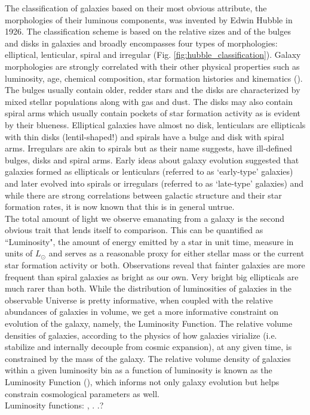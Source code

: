The classification of galaxies based on their most obvious attribute, the morphologies of their luminous components, was invented by Edwin Hubble in 1926. The classification scheme is based on the relative sizes and of the bulges and disks in galaxies and broadly encompasses four types of morphologies: elliptical, lenticular, spiral and irregular (Fig. \ref{fig:hubble_classification}). Galaxy morphologies are strongly correlated with their other physical properties such as luminosity, age, chemical composition, star formation histories and kinematics (\citealt{roberts94a}). The bulges usually contain older, redder stars and the disks are characterized by mixed stellar populations along with gas and dust. The disks may also contain spiral arms which usually contain pockets of star formation activity as is evident by their blueness. Elliptical galaxies have almost no disk, lenticulars are ellipticals with thin disks (lentil-shaped!) and spirals have a bulge and disk with spiral arms. Irregulars are akin to spirals but as their name suggests, have ill-defined bulges, disks and spiral arms. Early ideas about galaxy evolution suggested that galaxies formed as ellipticals or lenticulars (referred to as `early-type' galaxies) and later evolved into spirals or irregulars (referred to as `late-type' galaxies) and while there are strong correlations between galactic structure and their star formation rates, it is now known that this is in general untrue.\\

The total amount of light we observe emanating from a galaxy is the second obvious trait that lends itself to comparison. This can be quantified as ``Luminosity", the amount of energy emitted by a star in unit time, measure in units of $L_{\odot}$ and serves as a reasonable proxy for either stellar mass or the current star formation activity or both. Observations reveal that fainter galaxies are more frequent than spiral galaxies as bright as our own. Very bright big ellipticals are much rarer than both. While the distribution of luminosities of galaxies in the observable Universe is pretty informative, when coupled with the relative abundances of galaxies in volume, we get a more informative constraint on evolution of the galaxy, namely, the Luminosity Function. The relative volume densities of galaxies, according to the physics of how galaxies virialize (i.e. stabilize and internally decouple from cosmic expansion), at any given time, is constrained by the mass of the galaxy. The relative volume density of galaxies within a given luminosity bin as a function of luminosity is known as the Luminosity Function (\citet{1988MNRAS.232..431E, 2003ApJ...599...38B}), which informs not only galaxy evolution but helps constrain cosmological parameters as well. \\
Luminosity functions: \citep{2012MNRAS.421..621B}, \citep{2012MNRAS.420.1239L}  . .?

